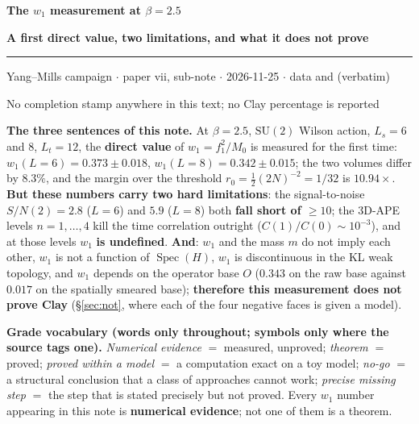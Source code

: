 \documentclass[11pt,a4paper]{article}
\newcommand{\code}[1]{\texttt{\footnotesize\detokenize{#1}}}
\newcommand{\nogo}{no-go}
\newcommand{\SU}{\mathrm{SU}}
\begin{document}
\begin{center}
  {\LARGE\bfseries The $w_1$ measurement at $\beta=2.5$\par}
  \vspace{0.35em}
  {\large\bfseries A first direct value, two limitations, and what it does not prove\par}
  \vspace{0.45em}
  \rule{0.62\textwidth}{0.5pt}\par
  \vspace{0.4em}
  {\small Yang--Mills campaign $\cdot$ paper vii, sub-note \code{w1} $\cdot$ 2026-11-25 $\cdot$
   data \code{RUN1.md} and \code{RUN3.md} (verbatim)\par}
  \vspace{0.15em}
  {\small No completion stamp anywhere in this text; no Clay percentage is reported\par}
\end{center}

\vspace{0.2em}

\noindent
\textbf{The three sentences of this note.} At $\beta=2.5$, $\SU(2)$ Wilson action, $L_s=6$ and $8$, $L_t=12$,
the \textbf{direct value} of $w_1=f_1^2/M_0$ is measured for the first time: $w_1(L=6)=0.373\pm0.018$, $w_1(L=8)=0.342\pm0.015$;
the two volumes differ by $8.3\%$, and the margin over the threshold $r_0=\tfrac12(2N)^{-2}=1/32$ is $10.94\times$.
\textbf{But these numbers carry two hard limitations}: the signal-to-noise $S/N(2)=2.8$ ($L=6$) and $5.9$ ($L=8$) both
\textbf{fall short of $\ge10$};
the 3D-APE levels $n=1,\dots,4$ kill the time correlation outright ($C(1)/C(0)\sim 10^{-3}$), and at those levels $w_1$ \textbf{is undefined}.
\textbf{And}: $w_1$ and the mass $m$ do not imply each other, $w_1$ is not a function of $\operatorname{Spec}(H)$, $w_1$ is discontinuous
in the KL weak topology, and $w_1$ depends on the operator base $O$ ($0.343$ on the raw base against $0.017$ on the spatially smeared base);
\textbf{therefore this measurement does not prove Clay} (\S\ref{sec:not}, where each of the four negative faces is given a model).

\medskip
{\small
\textbf{Grade vocabulary (words only throughout; symbols only where the source tags one).} \emph{Numerical evidence} $=$ measured, unproved;
\emph{theorem} $=$ proved; \emph{proved within a model} $=$ a computation exact on a toy model; \emph{\nogo} $=$ a structural conclusion
that a class of approaches cannot work; \emph{precise missing step} $=$ the step that is stated precisely but not proved.
Every $w_1$ number appearing in this note is \textbf{numerical evidence}; not one of them is a theorem.
}
\end{document}
